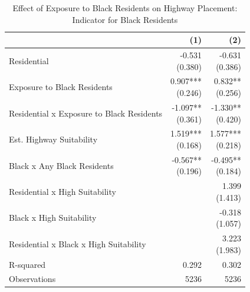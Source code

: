 \begin{table}[h]
\centering
\caption{Effect of Exposure to Black Residents on Highway Placement: Indicator for Black Residents}
\label{tab:outside_corridor_black_share_indicator}
\begin{threeparttable}
\begin{tabular*}{0.8\textwidth}{@{\extracolsep{\fill}}l*{2}{r}}
\toprule
 & (1) & (2) \\
\midrule
Residential & \makecell[tr]{-0.531 \\ (0.380)} & \makecell[tr]{-0.631 \\ (0.386)} \\
Exposure to Black Residents & \makecell[tr]{0.907{***} \\ (0.246)} & \makecell[tr]{0.832{**} \\ (0.256)} \\
Residential x Exposure to Black Residents & \makecell[tr]{-1.097{**} \\ (0.361)} & \makecell[tr]{-1.330{**} \\ (0.420)} \\
Est. Highway Suitability & \makecell[tr]{1.519{***} \\ (0.168)} & \makecell[tr]{1.577{***} \\ (0.218)} \\
Black x Any Black Residents & \makecell[tr]{-0.567{**} \\ (0.196)} & \makecell[tr]{-0.495{**} \\ (0.184)} \\
Residential x High Suitability &  & \makecell[tr]{1.399 \\ (1.413)} \\
Black x High Suitability &  & \makecell[tr]{-0.318 \\ (1.057)} \\
Residential x Black x High Suitability &  & \makecell[tr]{3.223 \\ (1.983)} \\
R-squared & 0.292 & 0.302 \\
Observations & 5236 & 5236 \\
\bottomrule
\end{tabular*}
\begin{tablenotes}[flushleft]
\footnotesize

\end{tablenotes}
\end{threeparttable}
\end{table}
